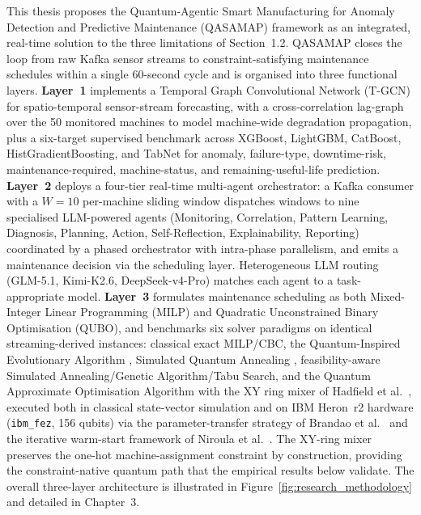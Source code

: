 This thesis proposes the Quantum-Agentic Smart Manufacturing for Anomaly Detection and Predictive Maintenance (QASAMAP) framework as an integrated, real-time solution to the three limitations of Section~1.2. QASAMAP closes the loop from raw Kafka sensor streams to constraint-satisfying maintenance schedules within a single $60$-second cycle and is organised into three functional layers. \textbf{Layer~1} implements a Temporal Graph Convolutional Network (T-GCN) \cite{Zhao2020} for spatio-temporal sensor-stream forecasting, with a cross-correlation lag-graph over the 50 monitored machines to model machine-wide degradation propagation, plus a six-target supervised benchmark across XGBoost, LightGBM, CatBoost, HistGradientBoosting, and TabNet for anomaly, failure-type, downtime-risk, maintenance-required, machine-status, and remaining-useful-life prediction. \textbf{Layer~2} deploys a four-tier real-time multi-agent orchestrator: a Kafka consumer with a $W=10$ per-machine sliding window dispatches windows to nine specialised LLM-powered agents (Monitoring, Correlation, Pattern Learning, Diagnosis, Planning, Action, Self-Reflection, Explainability, Reporting) coordinated by a phased orchestrator with intra-phase parallelism, and emits a maintenance decision via the scheduling layer. Heterogeneous LLM routing (GLM-5.1, Kimi-K2.6, DeepSeek-v4-Pro) matches each agent to a task-appropriate model. \textbf{Layer~3} formulates maintenance scheduling as both Mixed-Integer Linear Programming (MILP) and Quadratic Unconstrained Binary Optimisation (QUBO), and benchmarks six solver paradigms on identical streaming-derived instances: classical exact MILP/CBC, the Quantum-Inspired Evolutionary Algorithm \cite{HanKim2002}, Simulated Quantum Annealing \cite{KadowakiNishimori1998}, feasibility-aware Simulated Annealing/Genetic Algorithm/Tabu Search, and the Quantum Approximate Optimisation Algorithm \cite{Farhi2014} with the XY ring mixer of Hadfield et al.\ \cite{Hadfield2019}, executed both in classical state-vector simulation and on IBM Heron~r2 hardware (\texttt{ibm\_fez}, 156 qubits) via the parameter-transfer strategy of Brandao et al.\ \cite{Brandao2018} and the iterative warm-start framework of Niroula et al.\ \cite{Niroula2026}. The XY-ring mixer preserves the one-hot machine-assignment constraint by construction, providing the constraint-native quantum path that the empirical results below validate. The overall three-layer architecture is illustrated in Figure~\ref{fig:research_methodology} and detailed in Chapter~3.

